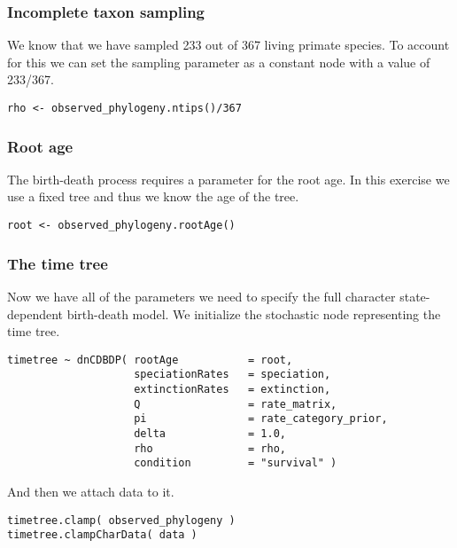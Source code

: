 \subsubsection{Incomplete taxon sampling}

We know that we have sampled 233 out of 367 living primate species. 
To account for this we can set the sampling parameter as a constant node with a value of 233/367.
{\tt \begin{snugshade*}
\begin{lstlisting}
rho <- observed_phylogeny.ntips()/367
\end{lstlisting}
\end{snugshade*}}


\subsubsection{Root age}

The birth-death process requires a parameter for the root age.
In this exercise we use a fixed tree and thus we know the age of the tree.
{\tt \begin{snugshade*}
\begin{lstlisting}
root <- observed_phylogeny.rootAge()
\end{lstlisting}
\end{snugshade*}}

\subsubsection{The time tree}

Now we have all of the parameters we need to specify the full character state-dependent birth-death model.
We initialize the stochastic node representing the time tree.
{\tt \begin{snugshade*}
\begin{lstlisting}
timetree ~ dnCDBDP( rootAge           = root,
                    speciationRates   = speciation,
                    extinctionRates   = extinction, 
                    Q                 = rate_matrix,
                    pi                = rate_category_prior,
                    delta             = 1.0,
                    rho               = rho,
                    condition         = "survival" )
\end{lstlisting}
\end{snugshade*}}
And then we attach data to it.
{\tt \begin{snugshade*}
\begin{lstlisting}
timetree.clamp( observed_phylogeny )
timetree.clampCharData( data )
\end{lstlisting}
\end{snugshade*}}


